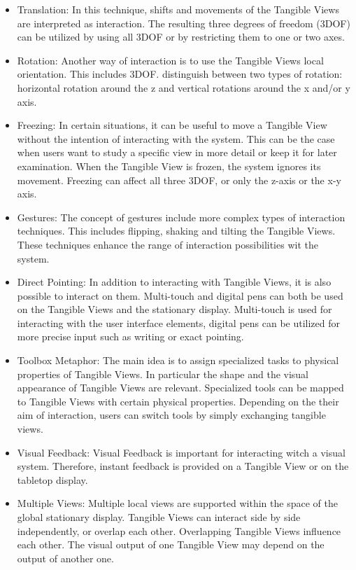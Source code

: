 \begin{itemize}
\item Translation: In this technique, shifts and movements of the Tangible Views are interpreted as interaction. The resulting three degrees of freedom (3DOF) can be utilized by using all 3DOF or by restricting them to one or two axes. 
\item Rotation: Another way of interaction is to use the Tangible Views local orientation. This includes 3DOF. \cite{spindler10} distinguish between two types of rotation: horizontal rotation around the z and vertical rotations around the x and/or y axis. 
\item Freezing: In certain situations, it can be useful to move a Tangible View without the intention of interacting with the system. This can be the case when users want to study a specific view in more detail or keep it for later examination. When the Tangible View is frozen, the system ignores its movement. Freezing can affect all three 3DOF, or only the z-axis or the x-y axis. 
\item Gestures: The concept of gestures include more complex types of interaction techniques. This includes flipping, shaking and tilting the Tangible Views. These techniques enhance the range of interaction possibilities wit the system.
\item Direct Pointing: In addition to interacting with Tangible Views, it is also possible to interact on them. Multi-touch and digital pens can both be used on the Tangible Views and the stationary display. Multi-touch is used for interacting with the user interface elements, digital pens can be utilized for more precise input such as writing or exact pointing. 
\item Toolbox Metaphor: The main idea is to assign specialized tasks to physical properties of Tangible Views. In particular the shape and the visual appearance of Tangible Views are relevant. Specialized tools can be mapped to Tangible Views with certain physical properties. Depending on the their aim of interaction, users can switch tools by simply exchanging tangible views.
\item Visual Feedback: Visual Feedback is important for interacting witch a visual system. Therefore, instant feedback is provided on a Tangible View or on the tabletop display.
\item Multiple Views: Multiple local views are supported within the space of the global stationary display. Tangible Views can interact side by side independently, or overlap each other. Overlapping Tangible Views influence each other. The visual output of one Tangible View may depend on the output of another one. 
\end{itemize}

